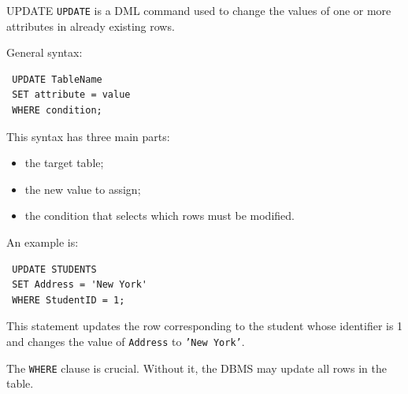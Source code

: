  \begin{defbox}{UPDATE}
  \texttt{UPDATE} is a DML command used to change the values of one or more attributes in already existing rows.
 \end{defbox}

 General syntax:

 \begin{verbatim}
 UPDATE TableName
 SET attribute = value
 WHERE condition;
 \end{verbatim}
 \vspace{-0.4cm}

 This syntax has three main parts:
 \begin{itemize}
  \item the target table;
  \item the new value to assign;
  \item the condition that selects which rows must be modified.
 \end{itemize}

 An example  is:

 \begin{verbatim}
 UPDATE STUDENTS
 SET Address = 'New York'
 WHERE StudentID = 1;
 \end{verbatim}
 \vspace{-0.4cm}

 This statement updates the row corresponding to the student whose identifier is 1 and changes the value of \texttt{Address} to \texttt{'New York'}.

 The \texttt{WHERE} clause is crucial. Without it, the DBMS may update all rows in the table.

